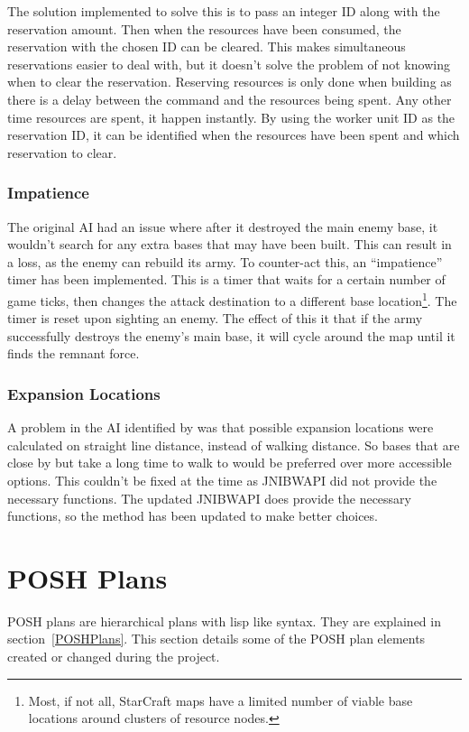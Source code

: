 \documentclass[11pt,openright,a4paper]{report}
\begin{document}
The solution implemented to solve this is to pass an integer ID along with the reservation amount. Then when the resources have been consumed, the reservation with the chosen ID can be cleared. This makes simultaneous reservations easier to deal with, but it doesn't solve the problem of not knowing when to clear the reservation. Reserving resources is only done when building as there is a delay between the command and the resources being spent. Any other time resources are spent, it happen instantly. By using the worker unit ID as the reservation ID, it can be identified when the resources have been spent and which reservation to clear.
\subsubsection{Impatience}
The original AI had an issue where after it destroyed the main enemy base, it wouldn't search for any extra bases that may have been built. This can result in a loss, as the enemy can rebuild its army. To counter-act this, an ``impatience'' timer has been implemented. This is a timer that waits for a certain number of game ticks, then changes the attack destination to a different base location\footnote{Most, if not all, StarCraft maps have a limited number of viable base locations around clusters of resource nodes.}. The timer is reset upon sighting an enemy. The effect of this it that if the army successfully destroys the enemy's main base, it will cycle around the map until it finds the remnant force.
\subsubsection{Expansion Locations}
A problem in the AI identified by  was that possible expansion locations were calculated on straight line distance, instead of walking distance. So bases that are close by but take a long time to walk to would be preferred over more accessible options. This couldn't be fixed at the time as JNIBWAPI did not provide the necessary functions. The updated JNIBWAPI does provide the necessary functions, so the method has been updated to make better choices.

\section{POSH Plans}
POSH plans are hierarchical plans with lisp like syntax. They are explained in section~\ref{POSHPlans}. This section details some of the POSH plan elements created or changed during the project.
\end{document}
